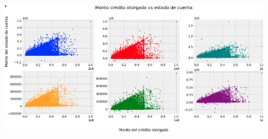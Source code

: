 \documentclass[12pt]{report}
\renewcommand{\_}{\kern-1.5pt\textunderscore\kern-1.5pt}
\begin{document}

\begin{figure}[H]
	\begin{Center}
		\includegraphics[width=6.27in,height=3.15in]{./media/image11.png}
	\end{Center}
\end{figure}




\vspace{\baselineskip}
\vspace{\baselineskip}

\vspace{\baselineskip}

\vspace{\baselineskip}

\vspace{\baselineskip}

\vspace{\baselineskip}

\vspace{\baselineskip}

\vspace{\baselineskip}

\vspace{\baselineskip}

\vspace{\baselineskip}

\vspace{\baselineskip}

\vspace{\baselineskip}

\vspace{\baselineskip}
\end{document}
